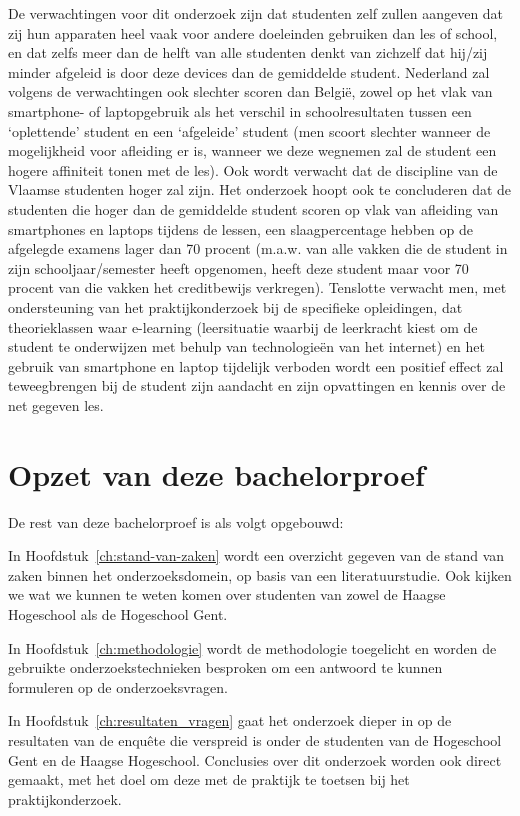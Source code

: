 De verwachtingen voor dit onderzoek zijn dat studenten zelf zullen aangeven dat zij hun apparaten heel vaak voor andere doeleinden gebruiken dan les of school, en dat zelfs meer dan de helft van alle studenten denkt van zichzelf dat hij/zij minder afgeleid is door deze devices dan de gemiddelde student. Nederland zal volgens de verwachtingen ook slechter scoren dan België, zowel op het vlak van smartphone- of laptopgebruik als het verschil in schoolresultaten tussen een ‘oplettende’ student en een ‘afgeleide’ student (men scoort slechter wanneer de mogelijkheid voor afleiding er is, wanneer we deze wegnemen zal de student een hogere affiniteit tonen met de les). Ook wordt verwacht dat de discipline van de Vlaamse studenten hoger zal zijn. Het onderzoek hoopt ook te concluderen dat de studenten die hoger dan de gemiddelde student scoren op vlak van afleiding van smartphones en laptops tijdens de lessen, een slaagpercentage hebben op de afgelegde examens lager dan 70 procent (m.a.w. van alle vakken die de student in zijn schooljaar/semester heeft opgenomen, heeft deze student maar voor 70 procent van die vakken het creditbewijs verkregen). Tenslotte verwacht men, met ondersteuning van het praktijkonderzoek bij de specifieke opleidingen, dat theorieklassen waar e-learning (leersituatie waarbij de leerkracht kiest om de student te onderwijzen met behulp van technologieën van het internet) en het gebruik van smartphone en laptop tijdelijk verboden wordt een positief effect zal teweegbrengen bij de student zijn aandacht en zijn opvattingen en kennis over de net gegeven les.

\section{Opzet van deze bachelorproef}
\label{sec:opzet-bachelorproef}

De rest van deze bachelorproef is als volgt opgebouwd:

In Hoofdstuk~\ref{ch:stand-van-zaken} wordt een overzicht gegeven van de stand van zaken binnen het onderzoeksdomein, op basis van een literatuurstudie. Ook kijken we wat we kunnen te weten komen over studenten van zowel de Haagse Hogeschool als de Hogeschool Gent.

In Hoofdstuk~\ref{ch:methodologie} wordt de methodologie toegelicht en worden de gebruikte onderzoekstechnieken besproken om een antwoord te kunnen formuleren op de onderzoeksvragen.

In Hoofdstuk~\ref{ch:resultaten_vragen} gaat het onderzoek dieper in op de resultaten van de enquête die verspreid is onder de studenten van de Hogeschool Gent en de Haagse Hogeschool. Conclusies over dit onderzoek worden ook direct gemaakt, met het doel om deze met de praktijk te toetsen bij het praktijkonderzoek.

